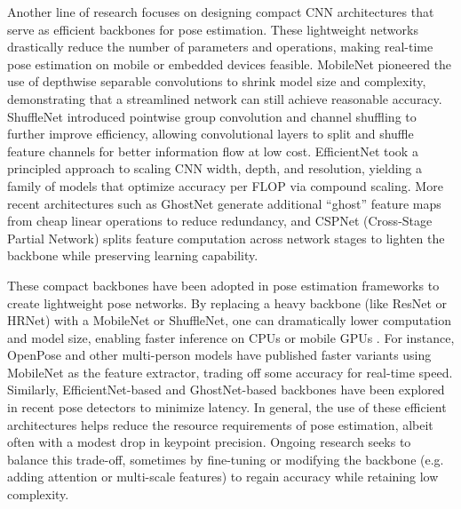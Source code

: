 Another line of research focuses on designing compact CNN architectures that serve as efficient backbones for pose estimation. These lightweight networks drastically reduce the number of parameters and operations, making real-time pose estimation on mobile or embedded devices feasible. MobileNet \citep{Howard2017} pioneered the use of depthwise separable convolutions to shrink model size and complexity, demonstrating that a streamlined network can still achieve reasonable accuracy. ShuffleNet \citep{Zhang2018} introduced pointwise group convolution and channel shuffling to further improve efficiency, allowing convolutional layers to split and shuffle feature channels for better information flow at low cost. EfficientNet \citep{Tan2019} took a principled approach to scaling CNN width, depth, and resolution, yielding a family of models that optimize accuracy per FLOP via compound scaling. More recent architectures such as GhostNet \citep{Han2020} generate additional “ghost” feature maps from cheap linear operations to reduce redundancy, and CSPNet \citep{Wang2020CSPNet} (Cross-Stage Partial Network) splits feature computation across network stages to lighten the backbone while preserving learning capability.

These compact backbones have been adopted in pose estimation frameworks to create lightweight pose networks. By replacing a heavy backbone (like ResNet or HRNet) with a MobileNet or ShuffleNet, one can dramatically lower computation and model size, enabling faster inference on CPUs or mobile GPUs \citep{Osokin2018}. For instance, OpenPose and other multi-person models have published faster variants using MobileNet as the feature extractor, trading off some accuracy for real-time speed. Similarly, EfficientNet-based and GhostNet-based backbones have been explored in recent pose detectors to minimize latency. In general, the use of these efficient architectures helps reduce the resource requirements of pose estimation, albeit often with a modest drop in keypoint precision. Ongoing research seeks to balance this trade-off, sometimes by fine-tuning or modifying the backbone (e.g. adding attention or multi-scale features) to regain accuracy while retaining low complexity.

